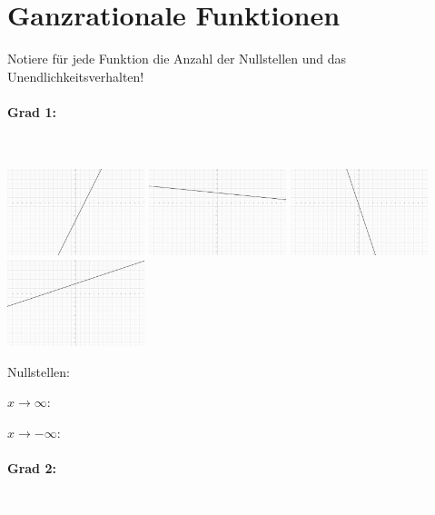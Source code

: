 \documentclass[12pt, parskip=half, a4paper, oneside]{scrartcl}
\begin{document}
\section*{Ganzrationale Funktionen}
Notiere für jede Funktion die Anzahl der Nullstellen und das Unendlichkeitsverhalten!

\paragraph{Grad 1:}\textcolor{white}{.}

\includegraphics[width=4cm]{Bilder/G11}\hfill
\includegraphics[width=4cm]{Bilder/G12}\hfill
\includegraphics[width=4cm]{Bilder/G13}\hfill
\includegraphics[width=4cm]{Bilder/G14}

\begin{addmargin}[-2cm]{0pt}
Nullstellen:

$x\rightarrow\infty:$

$x\rightarrow-\infty:$
\end{addmargin}

\paragraph{Grad 2:}\textcolor{white}{.}
\end{document}
